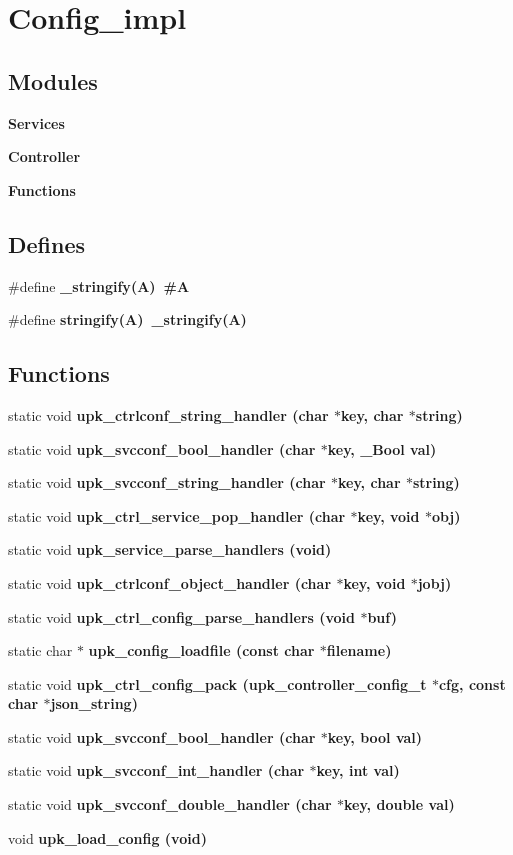\section{Config\_\-impl}
\label{group__config__impl}
\subsection*{Modules}
\begin{CompactItemize}
\item 
\bf{Services}
\item 
\bf{Controller}
\item 
\bf{Functions}
\end{CompactItemize}
\subsection*{Defines}
\begin{CompactItemize}
\item 
\#define \bf{\_\-stringify}(A)~\#A
\item 
\#define \bf{stringify}(A)~\_\-stringify(A)
\end{CompactItemize}
\subsection*{Functions}
\begin{CompactItemize}
\item 
static void \bf{upk\_\-ctrlconf\_\-string\_\-handler} (char $\ast$key, char $\ast$string)
\item 
static void \bf{upk\_\-svcconf\_\-bool\_\-handler} (char $\ast$key, \_\-Bool val)
\item 
static void \bf{upk\_\-svcconf\_\-string\_\-handler} (char $\ast$key, char $\ast$string)
\item 
static void \bf{upk\_\-ctrl\_\-service\_\-pop\_\-handler} (char $\ast$key, void $\ast$obj)
\item 
static void \bf{upk\_\-service\_\-parse\_\-handlers} (void)
\item 
static void \bf{upk\_\-ctrlconf\_\-object\_\-handler} (char $\ast$key, void $\ast$jobj)
\item 
static void \bf{upk\_\-ctrl\_\-config\_\-parse\_\-handlers} (void $\ast$buf)
\item 
static char $\ast$ \bf{upk\_\-config\_\-loadfile} (const char $\ast$filename)
\item 
static void \bf{upk\_\-ctrl\_\-config\_\-pack} (\bf{upk\_\-controller\_\-config\_\-t} $\ast$cfg, const char $\ast$json\_\-string)
\item 
static void \bf{upk\_\-svcconf\_\-bool\_\-handler} (char $\ast$key, bool val)
\item 
static void \bf{upk\_\-svcconf\_\-int\_\-handler} (char $\ast$key, int val)
\item 
static void \bf{upk\_\-svcconf\_\-double\_\-handler} (char $\ast$key, double val)
\item 
void \bf{upk\_\-load\_\-config} (void)
\end{CompactItemize}
